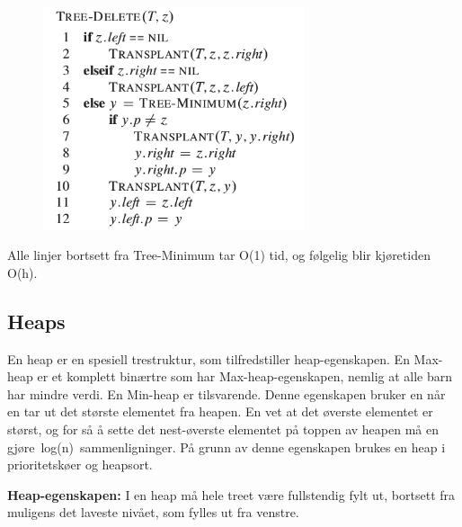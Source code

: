 \documentclass[12pt]{report}
\begin{document}
 \par




\begin{figure}[H]
	\begin{Center}
		\includegraphics[width=3.03in,height=2.58in]{./media/image85.png}
	\end{Center}
\end{figure}



\par


\vspace{\baselineskip}
Alle linjer bortsett fra Tree-Minimum tar O(1) tid, og følgelig blir kjøretiden O(h).\par


\vspace{\baselineskip}\subsection*{Heaps}
En heap er en spesiell trestruktur, som tilfredstiller heap-egenskapen. En Max-heap er et komplett binærtre som har Max-heap-egenskapen, nemlig at alle barn har mindre verdi. En Min-heap er tilsvarende. Denne egenskapen bruker en når en tar ut det største elementet fra heapen. En vet at det øverste elementet er størst, og for så å sette det nest-øverste elementet på toppen av heapen må en gjøre log(n) sammenligninger. På grunn av denne egenskapen brukes en heap i prioritetskøer og heapsort.\par

\textbf{Heap-egenskapen: }I en heap må hele treet være fullstendig fylt ut, bortsett fra muligens det laveste nivået, som fylles ut fra venstre.\par
\end{document}
